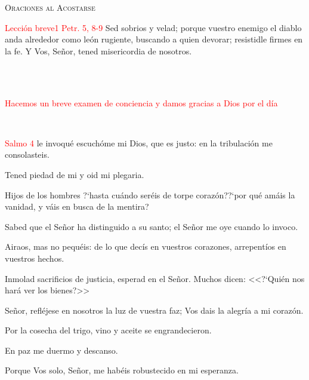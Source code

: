 \documentclass[9pt]{article}
\begin{document}
\begin{multicols}{2}
      \begin{center}
            \textsc{\Large{Oraciones al Acostarse}}
      \end{center}
      \textcolor{red}{Lección breve}\hfill\textcolor{red}{1 Petr. 5, 8-9}
      Sed sobrios y velad; porque vuestro enemigo el diablo anda alrededor como león rugiente, buscando a quien devorar; resistidle firmes en la fe.
      Y Vos, Señor, tened misericordia de nosotros.\\[1mm]
      \\[1mm]
      \begin{otherlanguage}{latin}
            \\[1mm]
      \end{otherlanguage}
      \textcolor{red}{Hacemos un breve examen de conciencia y damos gracias a Dios por el día}\\[1mm]
      \begin{otherlanguage}{latin}
            \\[1mm]
      \end{otherlanguage}
      \hfill\textcolor{red}{Salmo 4}
      le invoqué escuchóme mi Dios, que es justo: en la tribulación me consolasteis.

      Tened piedad de mi y oid mi plegaria.

      Hijos de los hombres {?`}hasta cuándo seréis de torpe corazón?{?`}por qué amáis la vanidad, y váis en busca de la mentira?

      Sabed que el Señor ha distinguido a su santo; el Señor me oye cuando lo invoco.

      Airaos, mas no pequéis: de lo que decís en vuestros corazones, arrepentíos en vuestros hechos.
      
      Inmolad sacrificios de justicia, esperad en el Señor. Muchos dicen: <<{?`}Quién nos hará ver los bienes?>>

      Señor, refléjese en nosotros la luz de vuestra faz; Vos dais la alegría a mi corazón.

      Por la cosecha del trigo, vino y aceite se engrandecieron.

      En paz me duermo y descanso.

      Porque Vos solo, Señor, me habéis robustecido en mi esperanza.\\
      \begin{otherlanguage}{latin}
            
      \end{otherlanguage}


\end{multicols}
\end{document}
